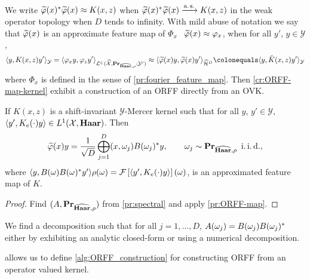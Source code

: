 \paragraph{}
We write $\tildePhi{1:D}(x)^\adjoint \tildePhi{1:D}(x)\approx K(x,z)$ when $\tildePhi{1:D}(x)^\adjoint \tildePhi{1:D}(x)\converges{\asurely}{} K(x,z)$ in the weak operator topology when $D$ tends to infinity. With mild abuse of notation we say that $\tildePhi{1:D}(x)$ is an approximate feature map of $\Phi_x$ \ie~$\tildePhi{1:D}(x)\approx \Phi_x$, when for all $y'$, $y\in\mathcal{Y}$,
\begin{dmath*}
\inner{y, K(x,z)y'}_{\mathcal{Y}}=\inner{\Phi_x y, \Phi_z y'}_{\mathcal{L^2(\dual{\mathcal{X}},\probability_{\dual{\Haar},\rho};\mathcal{Y'})}}\approx \inner{\tildePhi{1:D}(x)y, \tildePhi{1:D}(x)y'}_{\widetilde{\mathcal{H}}^D}\colonequals \inner{y, \tilde{K}(x,z)y'}_{\mathcal{Y}}
\end{dmath*}
where $\Phi_x$ is defined in the sense of \cref{pr:fourier_feature_map}. Then \cref{cr:ORFF-map-kernel} exhibit a construction of an \acs{ORFF} directly from an \acs{OVK}.
\begin{corollary}
\label{cr:ORFF-map-kernel}
If $K(x,z)$ is a shift-invariant $\mathcal{Y}$-Mercer kernel such that for all $y$, $y'\in\mathcal{Y}$, $\langle y', K_e(\cdot)y\rangle\in L^1(\mathcal{X},\mathbf{Haar})$. Then
\begin{equation}
\tildePhi{1:D}(x)y= \frac{1}{\sqrt{D}}\Vect_{j=1}^D\pairing{x, \omega_j}B(\omega_j)^\adjoint y, \qquad \omega_j \sim \probability_{\dual{\Haar},\rho} \enskip\text{\iid},
\end{equation}
where $\langle y, B(\omega)B(\omega)^* y'\rangle\rho(\omega)=\mathcal{F}\left[\langle y', K_e(\cdot)y\rangle\right](\omega)$, is an approximated feature map of $K$.
\end{corollary}
\begin{proof}
Find $(A, {\mathbf{{Pr}}}_{\widehat{\mathbf{Haar}},\rho})$ from \cref{pr:spectral} and apply \cref{pr:ORFF-map}.
\end{proof}
\begin{remark}
We find a decomposition such that for all $j=1, \ldots, D$, $A(\omega_j)=B(\omega_j)B(\omega_j)^* $ either by exhibiting an analytic closed-form or using a numerical decomposition.
\end{remark}
 allows us to define \cref{alg:ORFF_construction} for constructing \acs{ORFF} from an operator valued kernel.
